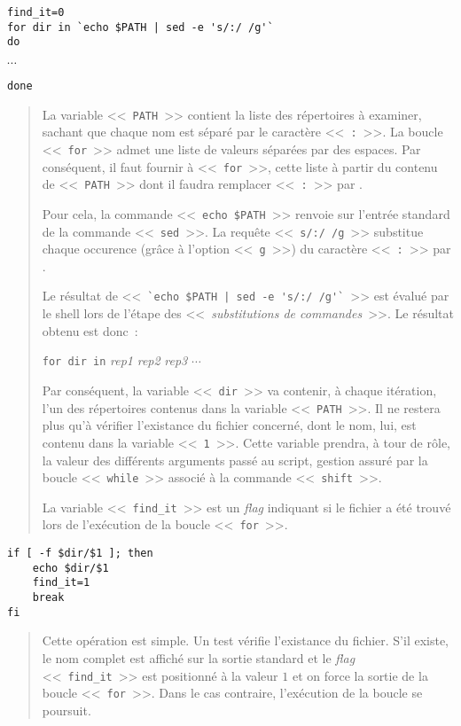 \begin{verbatim}
find_it=0
for dir in `echo $PATH | sed -e 's/:/ /g'`
do
\end{verbatim}
\vspace{2ex}
$\cdots$
\\[2ex]
\begin{verbatim}
done
\end{verbatim}
\begin{quote}
La variable <<~{\tt PATH}~>> contient la liste des r{\'e}pertoires {\`a} examiner, sachant que chaque nom est s{\'e}par{\'e} par le caract{\`e}re <<~{\tt :}~>>. La boucle <<~{\tt for}~>> admet une liste de valeurs s{\'e}par{\'e}es par des espaces. Par cons{\'e}quent, il faut fournir {\`a} <<~{\tt for}~>>, cette liste {\`a} partir du contenu de <<~{\tt PATH}~>> dont il faudra remplacer <<~{\tt :}~>> par \spacekey.

Pour cela, la commande <<~\verb,echo $PATH,~>> renvoie sur l'entr{\'e}e standard de la commande <<~{\tt sed}~>>. La requ{\^e}te <<~\verb*,s/:/ /g,~>> substitue chaque occurence (gr{\^a}ce {\`a} l'option <<~{\tt g}~>>) du caract{\`e}re <<~{\tt :}~>> par \spacekey.

Le r{\'e}sultat de <<~\verb*,`echo $PATH | sed -e 's/:/ /g'`,~>> est {\'e}valu{\'e} par le shell lors de l'{\'e}tape des <<~{\sl substitutions de commandes}~>>. Le r{\'e}sultat obtenu est donc~:
\begin{center}
\verb,for dir in, {\sl rep1} {\sl rep2} {\sl rep3} $\cdots$
\end{center}
Par cons{\'e}quent, la variable <<~{\tt dir}~>> va contenir, {\`a} chaque it{\'e}ration, l'un des r{\'e}pertoires contenus dans la variable <<~{\tt PATH}~>>. Il ne restera plus qu'{\`a} v{\'e}rifier l'existance du fichier concern{\'e}, dont le nom, lui, est contenu dans la variable <<~{\tt 1}~>>. Cette variable prendra, {\`a} tour de r{\^o}le, la valeur des diff{\'e}rents arguments pass{\'e} au script, gestion assur{\'e} par la boucle <<~{\tt while}~>> associ{\'e} {\`a} la commande <<~{\tt shift}~>>.

La variable <<~{\tt find\_it}~>> est un {\it flag} indiquant si le fichier a {\'e}t{\'e} trouv{\'e} lors de l'ex{\'e}cution de la boucle <<~{\tt for}~>>.
\end{quote}

\begin{verbatim}
if [ -f $dir/$1 ]; then
    echo $dir/$1
    find_it=1
    break
fi
\end{verbatim}
\begin{quote}
Cette op{\'e}ration est simple. Un test v{\'e}rifie l'existance du fichier. S'il existe, le nom complet est affich{\'e} sur la sortie standard et le {\it flag} <<~{\tt find\_it}~>> est positionn{\'e} {\`a} la valeur $1$ et on force la sortie de la boucle <<~{\tt for}~>>. Dans le cas contraire, l'ex{\'e}cution de la boucle se poursuit.
\end{quote}

